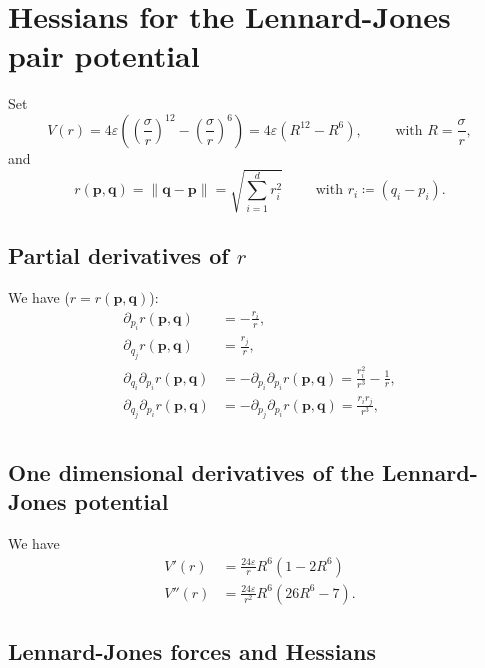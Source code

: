 \documentclass{scrartcl}
\newcommand{\boldp}{\boldsymbol{p}}
\newcommand{\boldq}{\boldsymbol{q}}
\begin{document}
\section{Hessians for the Lennard-Jones pair potential}
\label{sec:hess-lenn-jones}

Set 
\begin{equation}
  \label{eq:1}
  V(r) =  4 \varepsilon \left( (\frac{\sigma}{r})^{12} -
    (\frac{\sigma}{r})^{6} \right) = 4 \varepsilon \left( R^{12} -
    R^6 \right),  \qquad \text{ with } R = \frac{\sigma}{r},  
\end{equation}
and 
\begin{equation}
  \label{eq:2}
  r(\boldp, \boldq) = \lVert \boldq - \boldp \rVert =
  \sqrt{\sum_{i=1}^d r_i^2} \qquad \text{ with } r_i \coloneqq (q_i - p_i).
\end{equation}

\subsection{Partial derivatives of \(r\)}
\label{sec:part-deriv-r}

We have (\(r = r(\boldp, \boldq)\)):
\begin{align}
\partial_{p_i} r(\boldp, \boldq) &= - \frac{r_i}{r},  \\
\partial_{q_j} r(\boldp, \boldq) &=  \frac{r_j}{r},  \\
\partial_{q_i}\partial_{p_i} r(\boldp, \boldq) &= - \partial_{p_i}\partial_{p_i} r(\boldp, \boldq) =  \frac{r_i^2}{r^3} - \frac{1}{r},  \\
\partial_{q_j}\partial_{p_i} r(\boldp, \boldq) &= - \partial_{p_j}\partial_{p_i} r(\boldp, \boldq) =  \frac{r_ir_j}{r^3}, \\
\end{align}

\subsection{One dimensional derivatives of the Lennard-Jones
  potential}
\label{sec:one-dimens-deriv}

We have 
\begin{align}
  V'(r) &= \frac{24 \varepsilon}{r} R^6 \left(1 - 2 R^6\right) \\
  V''(r) &= \frac{24 \varepsilon}{r^2} R^6 \left( 26 R^6 - 7 \right).
\end{align}

\subsection{Lennard-Jones forces and Hessians}
\label{sec:lennard-jones-forces}
\end{document}
